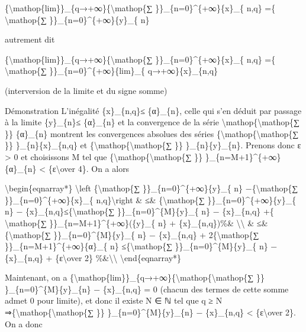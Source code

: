 \documentclass[]{article}
\begin{document}
\{\textbackslash{}mathop\{lim\}\}\_\{q→+∞\}\{\textbackslash{}mathop\{∑
\}\}\_\{n=0\}\^{}\{+∞\}\{x\}\_\{ n,q\} =\{ \textbackslash{}mathop\{∑
\}\}\_\{n=0\}\^{}\{+∞\}\{y\}\_\{ n\}

autrement dit

\{\textbackslash{}mathop\{lim\}\}\_\{q→+∞\}\{\textbackslash{}mathop\{∑
\}\}\_\{n=0\}\^{}\{+∞\}\{x\}\_\{ n,q\} =\{ \textbackslash{}mathop\{∑
\}\}\_\{n=0\}\^{}\{+∞\}\{lim\}\_\{ q→+∞\}\{x\}\_\{n,q\}

(interversion de la limite et du signe somme)

Démonstration L'inégalité \textbar{}\{x\}\_\{n,q\}\textbar{}≤
\{α\}\_\{n\}, celle qui s'en déduit par passage à la limite
\textbar{}\{y\}\_\{n\}\textbar{}≤ \{α\}\_\{n\} et la convergence de la
série \textbackslash{}mathop\{\textbackslash{}mathop\{∑ \}\}
\{α\}\_\{n\} montrent les convergences absolues des séries
\{\textbackslash{}mathop\{\textbackslash{}mathop\{∑ \}\}
\}\_\{n\}\{x\}\_\{n,q\} et
\{\textbackslash{}mathop\{\textbackslash{}mathop\{∑ \}\}
\}\_\{n\}\{y\}\_\{n\}. Prenons donc ε \textgreater{} 0 et choisissons M
tel que \{\textbackslash{}mathop\{\textbackslash{}mathop\{∑ \}\}
\}\_\{n=M+1\}\^{}\{+∞\}\{α\}\_\{n\} \textless{} \{ε\textbackslash{}over
4\}. On a alors

\textbackslash{}begin\{eqnarray*\} \textbackslash{}left
\textbar{}\{\textbackslash{}mathop\{∑ \}\}\_\{n=0\}\^{}\{+∞\}\{y\}\_\{
n\} −\{\textbackslash{}mathop\{∑ \}\}\_\{n=0\}\^{}\{+∞\}\{x\}\_\{
n,q\}\textbackslash{}right \textbar{}\& ≤\& \{\textbackslash{}mathop\{∑
\}\}\_\{n=0\}\^{}\{+∞\}\textbar{}\{y\}\_\{ n\} −
\{x\}\_\{n,q\}\textbar{}≤\{\textbackslash{}mathop\{∑
\}\}\_\{n=0\}\^{}\{M\}\textbar{}\{y\}\_\{ n\} − \{x\}\_\{n,q\}\textbar{}
+\{ \textbackslash{}mathop\{∑
\}\}\_\{n=M+1\}\^{}\{+∞\}(\textbar{}\{y\}\_\{ n\}\textbar{} +
\textbar{}\{x\}\_\{n,q\}\textbar{})\%\& \textbackslash{}\textbackslash{}
\& ≤\& \{\textbackslash{}mathop\{∑
\}\}\_\{n=0\}\^{}\{M\}\textbar{}\{y\}\_\{ n\} − \{x\}\_\{n,q\}\textbar{}
+ 2\{\textbackslash{}mathop\{∑ \}\}\_\{n=M+1\}\^{}\{+∞\}\{α\}\_\{ n\}
≤\{\textbackslash{}mathop\{∑ \}\}\_\{n=0\}\^{}\{M\}\textbar{}\{y\}\_\{
n\} − \{x\}\_\{n,q\}\textbar{} + \{ε\textbackslash{}over 2\}
\%\&\textbackslash{}\textbackslash{} \textbackslash{}end\{eqnarray*\}

Maintenant, on a
\{\textbackslash{}mathop\{lim\}\}\_\{q→+∞\}\{\textbackslash{}mathop\{\textbackslash{}mathop\{∑
\}\} \}\_\{n=0\}\^{}\{M\}\textbar{}\{y\}\_\{n\} −
\{x\}\_\{n,q\}\textbar{} = 0 (chacun des termes de cette somme admet 0
pour limite), et donc il existe N ∈ ℕ tel que q ≥ N
⇒\{\textbackslash{}mathop\{\textbackslash{}mathop\{∑ \}\}
\}\_\{n=0\}\^{}\{M\}\textbar{}\{y\}\_\{n\} − \{x\}\_\{n,q\}\textbar{}
\textless{} \{ε\textbackslash{}over 2\}. On a donc
\end{document}
